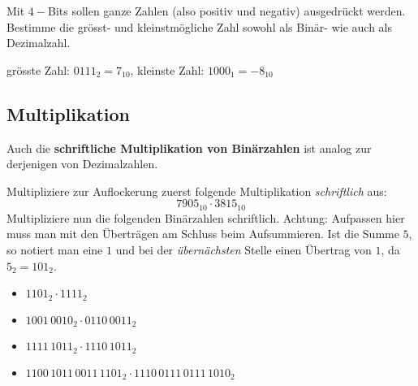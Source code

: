 \newpage

\begin{question}
	Mit $4-$Bits sollen ganze Zahlen (also positiv und negativ) ausgedrückt werden. Bestimme die grösst- und kleinstmögliche Zahl sowohl als Binär- wie auch als Dezimalzahl.
\end{question}
\begin{solution}
	grösste Zahl: $0111_2 = 7_{10}$, kleinste Zahl: $1000_1 = -8_{10}$
\end{solution}

\newpage

\subsection{Multiplikation}

\begin{question}
	Auch die \textbf{schriftliche Multiplikation von Binärzahlen} ist analog zur derjenigen von Dezimalzahlen.
	\begin{tasks}
		\task Multipliziere zur Auflockerung zuerst folgende Multiplikation \textit{schriftlich} aus:
		$$7905_{10} \cdot 3815_{10}$$
		\task Multipliziere nun die folgenden Binärzahlen schriftlich. Achtung: Aufpassen hier muss man mit den Überträgen am Schluss beim Aufsummieren. Ist die Summe $5$, so notiert man eine $1$ und bei der \textit{übernächsten} Stelle einen Übertrag von $1$, da $5_2 = 101_2$.
		\begin{itemize}
			\item $1101_2 \cdot 1111_2$
			\item $1001\,0010_2 \cdot 0110\,0011_2$
			\item $1111\,1011_2 \cdot 1110\,1011_2$
			\item $1100\,1011\,0011\,1101_2 \cdot 1110\,0111\,0111\,1010_2$
		\end{itemize}
	\end{tasks}
\end{question}

